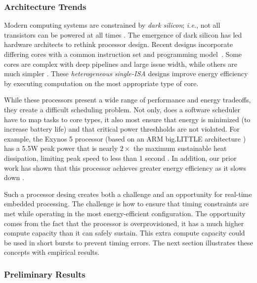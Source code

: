  
\subsubsection{Architecture Trends}
Modern computing systems are constrained by \emph{dark silicon};
\emph{i.e.}, not all transistors can be powered at all times
\cite{DaSi2011,Venkatesh2010}.  The emergence of dark silicon has led
hardware architects to rethink processor design.  Recent designs
incorporate differing cores with a common instruction set and
programming model~\cite{Kumar.2005.heterogeneous,SulemanMQP09}.  Some
cores are complex with deep pipelines and large issue width, while
others are much simpler \cite{bigLittle}.  These \emph{heterogeneous
single-ISA} designs improve energy efficiency by executing computation
on the most appropriate type of core.

While these processors present a wide range of performance and energy
tradeoffs, they create a difficult scheduling problem.  Not only, does
a software scheduler have to map tasks to core types, it also most
ensure that energy is minimized (to increase battery life) and that
critical power threshholds are not violated.  For example, the Exynos
5 processor (based on an ARM big.LITTLE architecture \cite{bigLittle})
has a 5.5W peak power that is nearly $2 \times$ the maximum
sustainable heat dissipation, limiting peak speed to less than 1
second \cite{exynos5}.  In addition, our prior work has shown that
this processor achieves greater energy efficiency as it slows down
\cite{Imes2014}.  

Such a processor desing creates both a challenge and an opportunity
for real-time embedded processing. The challenge is how to ensure that
timing constraints are met while operating in the most
energy-efficient configuration.  The opportunity comes from the fact
that the processor is overprovisioned, it has a much higher compute
capacity than it can safely sustain.  This extra compute capacity
could be used in short bursts to prevent timing errors.  The next
section illustrates these concepts with empirical results.

\subsubsection{Preliminary Results}


